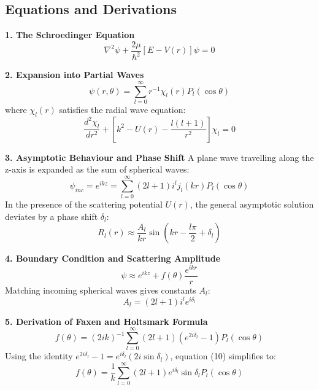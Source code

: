 \documentclass[12pt]{report}
\begin{document}
\begin{figure}[H]
    \centering
    
\end{figure}

\subsection*{Equations and Derivations}

\textbf{1. The Schroedinger Equation}
\begin{equation}
\nabla^2 \psi + \frac{2\mu}{\hbar^2} [E - V(r)] \psi = 0
\end{equation}

\textbf{2. Expansion into Partial Waves}
\begin{equation}
\psi(r, \theta) = \sum_{l=0}^{\infty} r^{-1} \chi_l(r) P_l(\cos \theta)
\end{equation}
where $\chi_l(r)$ satisfies the radial wave equation:
\begin{equation}
\frac{d^2\chi_l}{dr^2} + \left[ k^2 - U(r) - \frac{l(l+1)}{r^2} \right] \chi_l = 0
\end{equation}

\textbf{3. Asymptotic Behaviour and Phase Shift} A plane wave travelling along the z-axis is expanded as the sum of spherical waves:
\begin{equation}
\psi_{inc} = e^{ikz} = \sum_{l=0}^{\infty} (2l+1) i^l j_l(kr) P_l(\cos \theta)
\end{equation}
In the presence of the scattering potential $U(r)$, the general asymptotic solution deviates by a phase shift $\delta_l$:
\begin{equation}
R_l(r) \approx \frac{A_l}{kr} \sin\left(kr - \frac{l\pi}{2} + \delta_l\right)
\end{equation}

\textbf{4. Boundary Condition and Scattering Amplitude}
\begin{equation}
\psi \approx e^{ikz} + f(\theta) \frac{e^{ikr}}{r}
\end{equation}
Matching incoming spherical waves gives constants $A_l$:
\begin{equation}
A_l = (2l+1) i^l e^{i\delta_l}
\end{equation}

\textbf{5. Derivation of Faxen and Holtsmark Formula}
\begin{equation}
f(\theta) = (2ik)^{-1} \sum_{l=0}^{\infty} (2l+1) \left( e^{2i\delta_l} - 1 \right) P_l(\cos \theta)
\end{equation}
Using the identity $e^{2i\delta_l} - 1 = e^{i\delta_l}(2i \sin \delta_l)$, equation (10) simplifies to:
\begin{equation}
f(\theta) = \frac{1}{k} \sum_{l=0}^{\infty} (2l+1) e^{i\delta_l} \sin \delta_l P_l(\cos \theta)
\end{equation}
\end{document}
